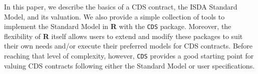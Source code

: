 \documentclass[a4paper]{article}
\begin{document}
In this paper, we describe the basics of a CDS contract, the ISDA
Standard Model, and its valuation. We also provide a simple collection
of tools to implement the Standard Model in \textbf{R} with the
\texttt{CDS} package. Moreover, the flexibility of \textbf{R} itself
allows users to extend and modify these packages to suit their own
needs and/or execute their preferred models for CDS contracts. Before
reaching that level of complexity, however, \texttt{CDS} provides a
good starting point for valuing CDS contracts following either the
Standard Model or user specifications.



\end{document}
